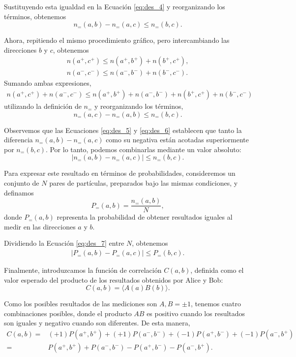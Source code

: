 Sustituyendo esta igualdad en la Ecuación \ref{eq:des_4} y reorganizando los términos, obtenemos
\begin{equation}
	n_{=}(a,b)-n_{=}(a,c)\leq n_{=}(b,c).
	\label{eq:des_5}
\end{equation}

Ahora, repitiendo el mismo procedimiento gráfico, pero intercambiando las direcciones $b$ y $c$, obtenemos
\begin{gather*}
	n(a^+,c^+) \leq n(a^+,b^+) + n(b^+,c^+),
	\\
	n(a^-,c^-) \leq n(a^-,b^-) + n(b^-,c^-).
\end{gather*}
Sumando ambas expresiones,
\begin{align*}
	n(a^+,c^+)+n(a^-,c^-)
	\leq n(a^+,b^+)+n(a^-,b^-) +n(b^+,c^+)+n(b^-,c^-)
\end{align*}
utilizando la definición de $n_{=}$ y reorganizando los términos,
\begin{equation}
	n_{=}(a,c)-n_{=}(a,b)\leq n_{=}(b,c).
	\label{eq:des_6}
\end{equation}

Observemos que las Ecuaciones \ref{eq:des_5} y \ref{eq:des_6} establecen que tanto la diferencia $n_{=}(a,b)-n_{=}(a,c)$ como su negativa están acotadas superiormente por $n_{=}(b,c)$. Por lo tanto, podemos combinarlas mediante un valor absoluto:
\begin{equation}
	|n_{=}(a,b)-n_{=}(a,c)|\leq n_{=}(b,c).
	\label{eq:des_7}
\end{equation}

Para expresar este resultado en términos de probabilidades, consideremos un conjunto de $N$ pares de partículas, preparados bajo las mismas condiciones, y definamos
$$ P_{=}(a,b)=\frac{n_{=}(a,b)}{N}, $$
donde $P_{=}(a,b)$ representa la probabilidad de obtener resultados iguales al medir en las direcciones $a$ y $b$.

Dividiendo la Ecuación \ref{eq:des_7} entre $N$, obtenemos \cite{material}
\begin{gather}
	|P_{=}(a,b)-P_{=}(a,c)|\leq P_{=}(b,c).
	\label{eq:des_proba}
\end{gather}

Finalmente, introduzcamos la función de correlación $C(a,b)$, definida como el valor esperado del producto de los resultados obtenidos por Alice y Bob:
$$ C(a,b)=\langle A(a)B(b)\rangle. $$

Como los posibles resultados de las mediciones son $A,B=\pm1$, tenemos cuatro combinaciones posibles, donde el producto $AB$ es positivo cuando los resultados son iguales y negativo cuando son diferentes. De esta manera,
\begin{align*}
	C(a,b)=&(+1)P(a^+,b^+)+(+1)P(a^-,b^-)+(-1)P(a^+,b^-)+(-1)P(a^-,b^+)
	\\
	=&P(a^+,b^+)+P(a^-,b^-)-P(a^+,b^-)-P(a^-,b^+).
\end{align*}

